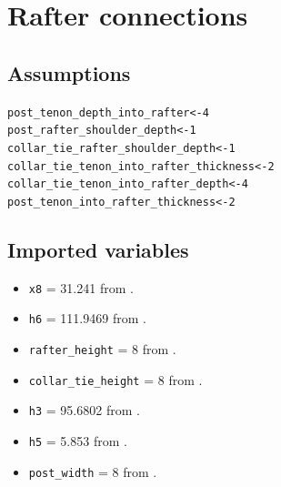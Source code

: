 \documentclass{article}\usepackage[]{graphicx}\usepackage[]{xcolor}
\makeatletter
\newcommand{\hlnum}[1]{\textcolor[rgb]{0.686,0.059,0.569}{#1}}%
\newcommand{\hlstd}[1]{\textcolor[rgb]{0.345,0.345,0.345}{#1}}%
\newcommand{\hlkwb}[1]{\textcolor[rgb]{0.69,0.353,0.396}{#1}}%
\newenvironment{kframe}{%
 \def\at@end@of@kframe{}%
 \ifinner\ifhmode%
  \def\at@end@of@kframe{\end{minipage}}%
  \begin{minipage}{\columnwidth}%
 \fi\fi%
 \def\FrameCommand##1{\hskip\@totalleftmargin \hskip-\fboxsep
 \colorbox{shadecolor}{##1}\hskip-\fboxsep
     \hskip-\linewidth \hskip-\@totalleftmargin \hskip\columnwidth}%
 \MakeFramed {\advance\hsize-\width
   \@totalleftmargin\z@ \linewidth\hsize
   \@setminipage}}%
 {\par\unskip\endMakeFramed%
 \at@end@of@kframe}
\newenvironment{knitrout}{}{} %
\makeatother
\begin{document}


 




\section{Rafter connections} \label{rafter-lengths-and-connections}

\subsection{Assumptions} \label{rafter-lengths-connections-assumptions}
\begin{knitrout}
\color{fgcolor}\begin{kframe}
\begin{alltt}
\hlstd{post_tenon_depth_into_rafter} \hlkwb{<-} \hlnum{4}
\hlstd{post_rafter_shoulder_depth} \hlkwb{<-} \hlnum{1}
\hlstd{collar_tie_rafter_shoulder_depth} \hlkwb{<-} \hlnum{1}
\hlstd{collar_tie_tenon_into_rafter_thickness} \hlkwb{<-} \hlnum{2}
\hlstd{collar_tie_tenon_into_rafter_depth} \hlkwb{<-} \hlnum{4}
\hlstd{post_tenon_into_rafter_thickness} \hlkwb{<-} \hlnum{2}
\end{alltt}
\end{kframe}
\end{knitrout}


\subsection{Imported variables} \label{rafter-lengths-connections-imported-variables}

\begin{itemize}
  \item \verb+x8+ = 31.241 from .
  \item \verb+h6+ = 111.9469 from .
  \item \verb+rafter_height+ = 8 from .
  \item \verb+collar_tie_height+ = 8 from . 
  \item \verb+h3+ = 95.6802 from .
  \item \verb+h5+ = 5.853 from .
  \item \verb+post_width+ = 8 from .
\end{itemize}
\end{document}
